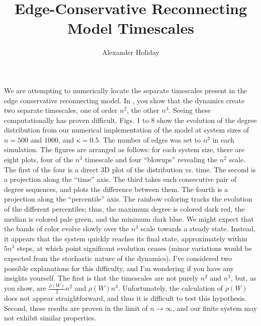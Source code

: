 \documentclass[11pt]{article}
\begin{document}
\title{\vspace{-5mm}Edge-Conservative Reconnecting Model Timescales}
\author{Alexander Holiday}
\maketitle

We are attempting to numerically locate the separate timescales present in the edge conservative reconnecting model. In \cite{Rath2012}, you show that the dynamics create two separate timescales, one of order $n^{2}$, the other $n^{3}$. Seeing these computationally has proven difficult. Figs. 1 to 8 show the evolution of the degree distribution from our numerical implementation of the model at system sizes of $n=500$ and $1000$, and $\kappa = 0.5$. The number of edges was set to $n^{2}$ in each simulation. The figures are arranged as follows: for each system size, there are eight plots, four of the $n^{3}$ timescale and four ``blowups'' revealing the $n^{2}$ scale. The first of the four is a direct 3D plot of the distribution vs. time. The second is a projection along the ``time'' axis. The third takes each consecutive pair of degree sequences, and plots the difference between them. The fourth is a projection along the ``percentile'' axis. The rainbow coloring tracks the evolution of the different percentiles; thus, the maximum degree is colored dark red, the median is colored pale green, and the minimum dark blue. We might expect that the bands of color evolve slowly over the $n^{3}$ scale towards a steady state. Instead, it appears that the system quickly reaches its final state, approximately within $5n^{3}$ steps, at which point significant evolution ceases (minor variations would be expected from the stochastic nature of the dynamics). I've considered two possible explanations for this difficulty, and I'm wondering if you have any insights yourself. The first is that the timescales are not purely $n^{2}$ and $n^{3}$, but, as you show, are $\frac{\rho(W)}{2} n^{2}$ and $\rho(W) n^{3}$. Unfortunately, the calculation of $\rho(W)$ does not appear straightforward, and thus it is difficult to test this hypothesis. Second, these results are proven in the limit of $n \rightarrow \infty$, and our finite system may not exhibit similar properties.





\end{document}
